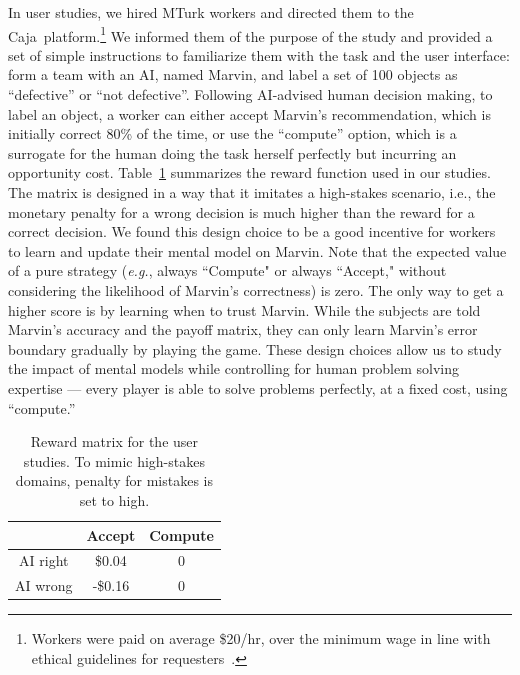 \documentclass[letterpaper]{article}
\newcommand{\eg}{\mbox{\it e.g.}}
\newcommand{\name}{AI-advised human decision making}
\newcommand{\plat}{{\sc Caja}}
\begin{document}
 In user studies, we hired MTurk workers and directed them to the \plat\ platform.\footnote{Workers were paid on average \$20/hr, over the minimum wage in line with  ethical guidelines for requesters~\cite{dynamo-MT-ethics17}.} We informed them of the purpose of the study and provided a set of simple instructions to familiarize them with the task and the user interface: form a team with an AI, named Marvin, and label a set of 100 objects as ``defective'' or ``not defective''.  
Following \name, to label an object, a worker can either accept Marvin's recommendation, which is initially correct 80\% of the time, or use the ``compute'' option, which is a surrogate for the human doing the task herself perfectly but incurring an opportunity cost.
Table~\ref{tab:payoff} summarizes the reward function  used in our studies. The matrix is designed in a way that it imitates a high-stakes scenario, i.e., the monetary penalty for a wrong decision is much higher than the reward for a correct decision. We found this design choice to be a good incentive for workers to learn and update their mental model on Marvin.  %
Note that the expected value of a pure strategy (\eg, always ``Compute"  or always ``Accept," without considering the likelihood of Marvin's correctness) is zero. The only way to get a higher score is by learning when to trust Marvin. While the subjects are told  Marvin's accuracy and the payoff matrix, they can only learn Marvin's error boundary gradually by playing the game.   These design choices allow us to study the impact of mental models while controlling for human problem solving expertise --- every player is able to solve  problems perfectly, at a fixed cost,  using ``compute.''\\


\begin{table}[t]
    \centering
    \begin{tabular}{|c|c|c|}
    \hline
         & Accept & Compute  \\
         \hline
         AI right & \$0.04 & 0 \\
         \hline
         AI wrong & -\$0.16 & 0\\
         \hline
    \end{tabular}
    \caption{Reward matrix for the user studies. To mimic high-stakes domains, penalty for mistakes is set to high. 
    }
    \label{tab:payoff}
\end{table}
\end{document}
